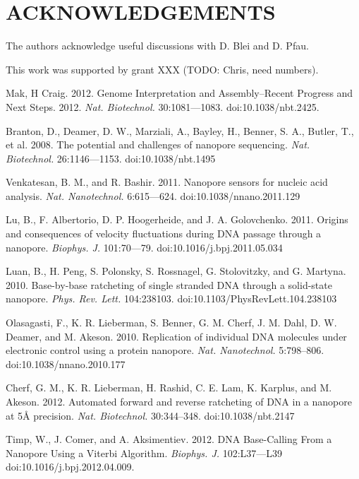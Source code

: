 \documentclass{biophys_letter}
\begin{document}
\section*{ACKNOWLEDGEMENTS}

The authors acknowledge useful discussions with D. Blei and D. Pfau.

This work was supported by grant XXX (TODO: Chris, need numbers).

\begin{thebibliography}{99}

  Mak, H Craig. 
  2012.
  Genome Interpretation and Assembly--Recent Progress and Next Steps.
  2012.
  {\it Nat. Biotechnol.}
  30:1081---1083.
  doi:10.1038/nbt.2425.

  Branton, D., Deamer, D. W., Marziali, A., Bayley, H., Benner, S. A., Butler, T., et al.
  2008.
  The potential and challenges of nanopore sequencing.
  {\it Nat. Biotechnol.}
  26:1146---1153.
  doi:10.1038/nbt.1495

  Venkatesan, B. M., and R. Bashir.
  2011.
  Nanopore sensors for nucleic acid analysis.
  {\it Nat. Nanotechnol.}
  6:615---624.
  doi:10.1038/nnano.2011.129

  Lu, B., F. Albertorio, D. P. Hoogerheide, and J. A. Golovchenko.
  2011.
  Origins and consequences of velocity fluctuations during DNA passage through a nanopore.
  {\it Biophys. J.}
  101:70---79.
  doi:10.1016/j.bpj.2011.05.034

  Luan, B., H. Peng, S. Polonsky, S. Rossnagel, G. Stolovitzky, and G. Martyna.
  2010.
  Base-by-base ratcheting of single stranded DNA through a solid-state nanopore.
  {\it Phys. Rev. Lett.}
  104:238103.
  doi:10.1103/PhysRevLett.104.238103

  Olasagasti, F., K. R. Lieberman, S. Benner, G. M. Cherf, J. M. Dahl, D. W. Deamer, and M. Akeson.
  2010.
  Replication of individual DNA molecules under electronic control using a protein nanopore.
  {\it Nat. Nanotechnol.}
  5:798--806.
  doi:10.1038/nnano.2010.177

  Cherf, G. M., K. R. Lieberman, H. Rashid, C. E. Lam, K. Karplus, and M. Akeson.
  2012.
  Automated forward and reverse ratcheting of DNA in a nanopore at 5{\AA} precision.
  {\it Nat. Biotechnol.}
  30:344--348.
  doi:10.1038/nbt.2147

  Timp, W., J. Comer, and A. Aksimentiev. 
  2012.
  DNA Base-Calling From a Nanopore Using a Viterbi Algorithm.
  {\it Biophys. J.}
  102:L37---L39
  doi:10.1016/j.bpj.2012.04.009.


\end{thebibliography}
\end{document}

